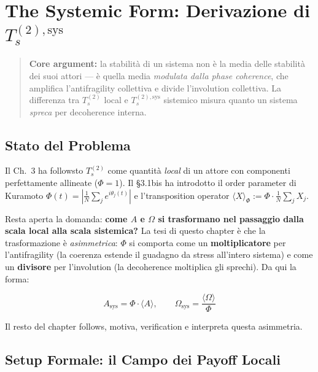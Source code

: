 \chapter{\texorpdfstring{The Systemic Form: Derivazione di
\(T_s^{(2),\text{sys}}\)}{The Systemic Form: Derivazione di T\_s\^{}\{(2),\textbackslash text\{sys\}\}}}\label{la-forma-sistemica-followszione-di-t_s2textsys}

\begin{quote}
\textbf{Core argument:} la stabilità di un sistema non è la media
delle stabilità dei suoi attori --- è quella media \emph{modulata dalla
phase coherence}, che amplifica l'antifragility collettiva e divide
l'involution collettiva. La differenza tra \(T_s^{(2)}\) local e
\(T_s^{(2),\text{sys}}\) sistemico misura quanto un sistema
\emph{spreca} per decoherence interna.
\end{quote}



\section{Stato del Problema}\label{stato-del-problema}

Il Ch.~3 ha followsto \(T_s^{(2)}\) come quantità \emph{local} di un
attore con componenti perfettamente allineate (\(\Phi = 1\)). Il \S{}3.1bis
ha introdotto il order parameter di Kuramoto
\(\Phi(t) = \left|\frac{1}{N}\sum_j e^{i\theta_j(t)}\right|\) e
l'transposition operator
\(\langle X \rangle_\Phi := \Phi \cdot \frac{1}{N}\sum_j X_j\).

Resta aperta la domanda: \textbf{come \(A\) e \(\Omega\) si trasformano
nel passaggio dalla scala local alla scala sistemica?} La tesi di
questo chapter è che la trasformazione è \emph{asimmetrica}: \(\Phi\)
si comporta come un \textbf{moltiplicatore} per l'antifragility (la
coerenza estende il guadagno da stress all'intero sistema) e come un
\textbf{divisore} per l'involution (la decoherence moltiplica gli
sprechi). Da qui la forma:

\[
A_{\text{sys}} = \Phi \cdot \langle A \rangle, \qquad \Omega_{\text{sys}} = \frac{\langle \Omega \rangle}{\Phi}
\]

Il resto del chapter follows, motiva, verification e interpreta questa
asimmetria.



\section{Setup Formale: il Campo dei Payoff
Locali}\label{setup-formal-il-campo-dei-payoff-locali}

